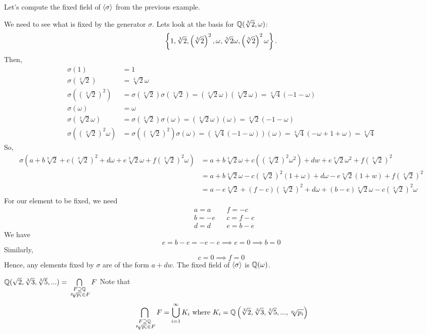 \begin{example}
    Let's compute the fixed field of $\left\langle \sigma \right\rangle$ from the previous example.

    We need to see what is fixed by the generator $\sigma$. Lets look at the basis for $\mathbb{Q}(\sqrt[3]{2}, \omega)$:
    $$\left\{1, \sqrt[3]{2}, \left(\sqrt[3]{2}\right)^2, \omega, \sqrt[3]{2}\omega, \left(\sqrt[3]{2}\right)^2\omega\right\}.$$
    Then,
    \begin{align*}
        \sigma(1) &= 1 \\
        \sigma\left(\sqrt[3]{2}\right) &= \sqrt[3]{2}\omega \\
        \sigma\left((\sqrt[3]{2}) ^2\right) &= \sigma\left(\sqrt[3]{2}\right)\sigma\left(\sqrt[3]{2}\right) = \left(\sqrt[3]{2}\omega\right)\left(\sqrt[3]{2}\omega\right) = \sqrt[3]{4}(-1-\omega) \\
        \sigma(\omega) &= \omega \\
        \sigma\left(\sqrt[3]{2} \omega\right) &= \sigma\left(\sqrt[3]{2}\right)\sigma(\omega) = \left(\sqrt[3]{2} \omega\right)\left(\omega\right) = \sqrt[3]{2}(-1-\omega) \\
        \sigma\left((\sqrt[3]{2})^2 \omega\right) &= \sigma\left((\sqrt[3]{2})^2\right)\sigma(\omega) = \left(\sqrt[3]{4}(-1-\omega)\right)(\omega) = \sqrt[3]{4}(-\omega + 1 + \omega) = \sqrt[3]{4}
    \end{align*}
    So,
    \begin{align*}
        \sigma\left(a+b\sqrt[3]{2} + c(\sqrt[3]{2})^2+d\omega + e\sqrt[3]{2} \omega + f (\sqrt[3]{2})^2 \omega\right)
        &= a + b \sqrt[3]{2} \omega + c \left((\sqrt[3]{2})^2\omega^2\right) + dw + e\sqrt[3]{2} \omega^2 + f (\sqrt[3]{2})^2 \\
        &= a + b \sqrt[3]{2} \omega - c(\sqrt[3]{2})^2(1+\omega) + d\omega - e \sqrt[3]{2}(1+w) + f(\sqrt[3]{2})^2 \\
        &= a - e \sqrt[3]{2} + (f-c)(\sqrt[3]{2})^2 +d\omega + (b-e)\sqrt[3]{2} \omega -c (\sqrt[3]{2})^2 \omega
    \end{align*}
    For our element to be fixed, we need
    \begin{align*}
        &a = a &&f=-c \\
        &b=-e &&c=f-c \\
        &d=d &&e=b-e
    \end{align*}
    We have
    $$e=b-e = -e-e \implies e = 0 \implies b = 0$$
    Similarly,
    $$c=0 \implies f = 0$$
    Hence, any elements fixed by $\sigma$ are of the form $a + dw$. The fixed field of $\left\langle \sigma \right\rangle$ is $\mathbb{Q}(\omega)$.
\end{example}

\begin{example}
    $\mathbb{Q}(\sqrt{2}, \sqrt[3]{3}, \sqrt[5]{5},...) = \bigcap \limits_{\substack{F \supseteq \mathbb{Q} \\ \sqrt[p_i]{p_i} \in F}} F$
    Note that
    $$\bigcap_{\substack{F \supseteq \mathbb{Q} \\ \sqrt[p_i]{p_i} \in F}} F = \bigcup_{i=1}^\infty K_i \text{ where } K_i = \mathbb{Q}\left(\sqrt[2]{2}, \sqrt[3]{3}, \sqrt[5]{5},...,\sqrt[p_i]{p_i}\right)$$
\end{example}